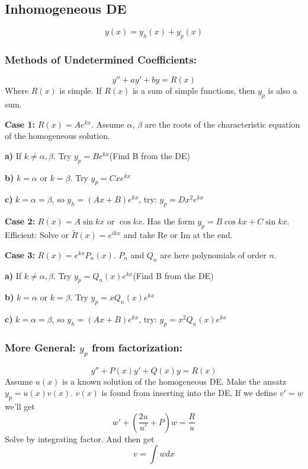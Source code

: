 \documentclass[a4paper,norsk, 10pt]{article}
\begin{document}
\subsection{Inhomogeneous DE}
\begin{equation}
y(x) = y_h(x) + y_p(x)
\end{equation}
\subsubsection{Methods of Undetermined Coefficients:}
\begin{equation}
y'' + ay' + by = R(x)
\end{equation}
Where $R(x)$ is simple. If $R(x)$ is a sum of simple functions, then $y_p$ is also a sum.

\textbf{Case 1:}
$R(x) = Ae^{kx}$. Assume $\alpha$, $\beta$ are the roots of the characteristic equation of the homogeneous solution.

\textbf{a)}
If $k \neq \alpha,\beta$. Try $y_p = Be^{kx}$(Find B from the DE)

\textbf{b)}
$k = \alpha$ or $k = \beta$. Try $y_p = Cxe^{kx}$

\textbf{c)}
$k=\alpha=\beta$, so $y_h = (Ax + B)e^{kx}$, try: $y_p = Dx^2e^{kx}$

\textbf{Case 2:}
$R(x) = A\sin kx$ or $ \cos kx$. Has the form $y_p = B\cos kx + C\sin kx$. Efficient: Solve or $\tilde{R}(x) = e^{ikx}$ and take Re or Im at the end.

\textbf{Case 3:}
$R(x) = e^{kx}P_n(x)$. $P_n$ and $Q_n$ are here polynomials of order $n$.

\textbf{a)}
If $k \neq \alpha,\beta$. Try $y_p = Q_n(x)e^{kx}$(Find B from the DE)

\textbf{b)}
$k = \alpha$ or $k = \beta$. Try $y_p = xQ_n(x)e^{kx}$

\textbf{c)}
$k=\alpha=\beta$, so $y_h = (Ax + B)e^{kx}$, try: $y_p = x^2Q_n(x)e^{kx}$

\subsubsection{More General: $y_p$ from factorization:}
\begin{equation}
y'' + P(x)y' + Q(x)y = R(x)
\end{equation}
Assume $u(x)$ is a known solution of the homogeneous DE. Make the ansatz $y_p = u(x)v(x)$. $v(x)$ is found from inserting into the DE. If we define $v' = w$ we'll get
\begin{equation}
w' + \left(\frac{2u}{u'} + P\right)w = \frac{R}{u}
\end{equation}
Solve by integrating factor. And then get 
\begin{equation}
v = \int w dx
\end{equation}
\end{document}
